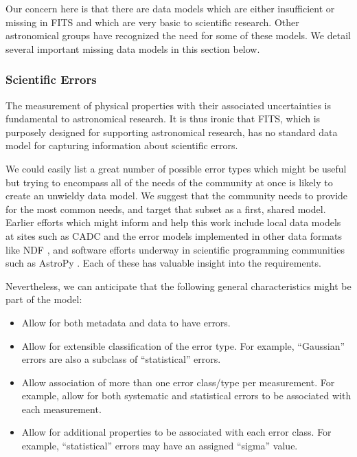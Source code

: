 \documentclass[final,authoryear,5p,times,twocolumn]{elsarticle}
\begin{document}
{{Our concern here is that there are data models which are either
insufficient or missing in FITS and which are very basic to scientific
research. Other astronomical groups have recognized the need for some of
these models. We detail
several important missing data models in this section below.

\subsubsection{Scientific Errors}


The measurement of physical properties with their associated uncertainties
is fundamental to astronomical
research. It is thus ironic that FITS, which is purposely designed for
supporting astronomical research, has no standard data model for
capturing information about scientific errors.


We could easily list a great number of possible error types which
might be useful but trying to encompass all of the needs of the
community at once is likely to create an unwieldy data model. We
suggest that the community needs to provide for the most common needs,
and target that subset as a first, shared model. Earlier efforts which
might inform and help this work include local data models at sites
such as CADC \citep{2012ASPC..461..339D} and the error
models implemented in other data formats like NDF
\citep[although see for example][]{1991STARB...8...19M}, and software
efforts underway in scientific programming communities such as AstroPy
\citep{2013A&A...558A..33A}. Each of these has valuable insight into
the requirements.


Nevertheless, we can anticipate that the following general
characteristics might be part of the model:

\begin{itemize}
\item Allow for both metadata and data to have errors.

\item Allow for extensible classification of the error type. For example,
``Gaussian'' errors are also a subclass of ``statistical'' errors.

\item Allow association of more than one error class/type per
measurement. For example, allow for both systematic and statistical
errors to be associated with each measurement.

\item Allow for additional properties to be associated with each error
class. For example, ``statistical'' errors may have an assigned ``sigma''
value.
\end{itemize}

}}
\end{document}
